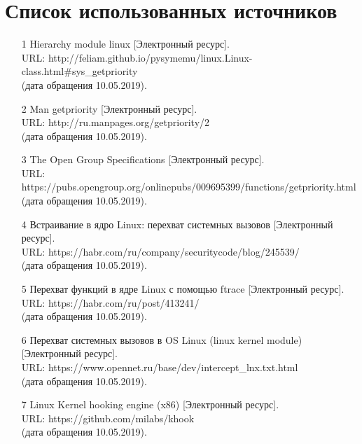 \section{Список использованных источников}

\begin{itemize}
    \item [1] Hierarchy module linux [Электронный ресурс].\\
    URL: http://feliam.github.io/pysymemu/linux.Linux-class.html#sys\_getpriority\\ 
    (дата обращения 10.05.2019). \\

    \item [2] Man getpriority [Электронный ресурс]. \\
    URL: http://ru.manpages.org/getpriority/2 \\
    (дата обращения 10.05.2019). \\

    \item [3] The Open Group Specifications [Электронный ресурс].\\
    URL: https://pubs.opengroup.org/onlinepubs/009695399/functions/getpriority.html \\
    (дата обращения 10.05.2019). \\
    
    \item [4] Встраивание в ядро Linux: перехват системных вызовов [Электронный ресурс]. \\
    URL: https://habr.com/ru/company/securitycode/blog/245539/ \\ 
    (дата обращения 10.05.2019). \\
    
    \item [5] Перехват функций в ядре Linux с помощью ftrace [Электронный ресурс]. \\
    URL: https://habr.com/ru/post/413241/\\ 
    (дата обращения 10.05.2019). \\
    
    \item [6] Перехват системных вызовов в OS Linux (linux kernel module)
 [Электронный ресурс]. \\
    URL: https://www.opennet.ru/base/dev/intercept\_lnx.txt.html \\ 
    (дата обращения 10.05.2019). \\
    
    \item [7] Linux Kernel hooking engine (x86) [Электронный ресурс]. \\
    URL: https://github.com/milabs/khook \\ 
    (дата обращения 10.05.2019). \\

\end{itemize}